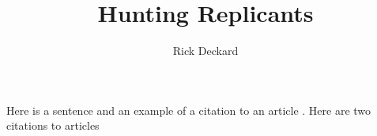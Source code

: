 \documentclass{article}
\title{Hunting Replicants}
\author{Rick Deckard}
\begin{document}
\maketitle

Here is a sentence and an example of a citation to an article \cite{mattar:2005aa}. Here are two citations to articles \cite{mattar:2005aa, mcgregor:2016aa}

 

\end{document}
